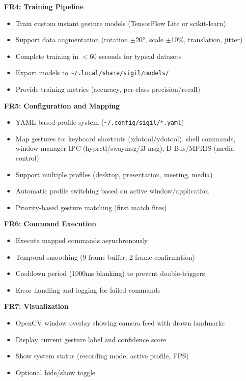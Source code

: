 \documentclass[11pt,a4paper]{article}
\begin{document}
\textbf{FR4: Training Pipeline}
\begin{itemize}
\item Train custom instant gesture models (TensorFlow Lite or scikit-learn)
\item Support data augmentation (rotation $\pm$20°, scale $\pm$10\%, translation, jitter)
\item Complete training in $<$60 seconds for typical datasets
\item Export models to \texttt{\textasciitilde/.local/share/sigil/models/}
\item Provide training metrics (accuracy, per-class precision/recall)
\end{itemize}

\textbf{FR5: Configuration and Mapping}
\begin{itemize}
\item YAML-based profile system (\texttt{\textasciitilde/.config/sigil/*.yaml})
\item Map gestures to: keyboard shortcuts (xdotool/ydotool), shell commands, window manager IPC (hyprctl/swaymsg/i3-msg), D-Bus/MPRIS (media control)
\item Support multiple profiles (desktop, presentation, meeting, media)
\item Automatic profile switching based on active window/application
\item Priority-based gesture matching (first match fires)
\end{itemize}

\textbf{FR6: Command Execution}
\begin{itemize}
\item Execute mapped commands asynchronously
\item Temporal smoothing (9-frame buffer, 2-frame confirmation)
\item Cooldown period (1000ms blanking) to prevent double-triggers
\item Error handling and logging for failed commands
\end{itemize}

\textbf{FR7: Visualization}
\begin{itemize}
\item OpenCV window overlay showing camera feed with drawn landmarks
\item Display current gesture label and confidence score
\item Show system status (recording mode, active profile, FPS)
\item Optional hide/show toggle
\end{itemize}
\end{document}
